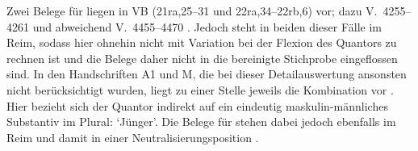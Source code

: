 \begin{exe}
\end{exe}

Zwei Belege für  liegen in VB (21ra,25--31 und
22ra,34--22rb,6) vor; dazu V.~4255--4261 und abweichend V.~4455--4470
\autocite[159, 163]{schroeder1895}. Jedoch steht  in beiden dieser
Fälle im Reim, sodass hier ohnehin nicht mit Variation bei der Flexion des
Quantors zu rechnen ist und die Belege daher nicht in die bereinigte Stichprobe
eingeflossen sind. In den Handschriften A1 und M, die bei dieser
Detailauswertung ansonsten nicht berücksichtigt wurden, liegt zu einer Stelle
jeweils die Kombination  vor . Hier bezieht
sich der Quantor indirekt auf ein eindeutig maskulin-männliches Substantiv im
Plural:  `Jünger'. Die Belege für  stehen dabei jedoch
ebenfalls im Reim und damit in einer Neutralisierungsposition
\autocites[vgl.][662--663]{grimm1870}[89]{askedal1973}.

